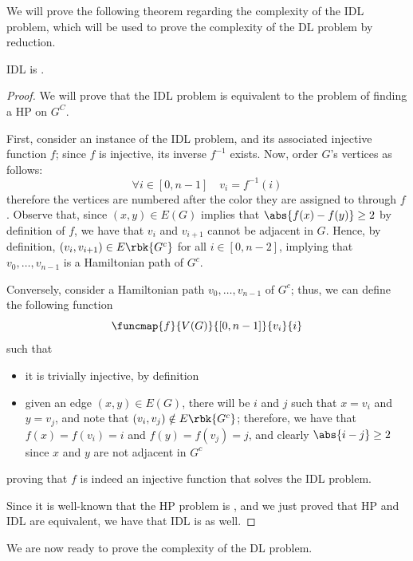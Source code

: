 \documentclass[a4paper, 12pt]{report}
\begin{document}
    We will prove the following theorem regarding the complexity of the IDL problem, which will be used to prove the complexity of the DL problem by reduction.

    \begin{framedthm}{}
        IDL is \NPComplete.
    \end{framedthm}

    \begin{proof}
        We will prove that the IDL problem is equivalent to the problem of finding a HP on $G^C$.

        First, consider an instance of the IDL problem, and its associated injective function $f$; since $f$ is injective, its inverse $f^{-1}$ exists. Now, order $G$'s vertices as follows: $$\forall i \in [0, n - 1] \quad v_i = f^{-1}(i)$$ therefore the vertices are numbered after the color they are assigned to through $f$. Observe that, since $(x, y) \in E(G)$ implies that $\abs{f(x) - f(y)} \ge 2$ by definition of $f$, we have that $v_i$ and $v_{i + 1}$ cannot be adjacent in $G$. Hence, by definition, $(v_i, v_{i + 1}) \in E\rbk{G^c}$ for all $i \in [0, n - 2]$, implying that $v_0 , \ldots, v_{n - 1}$ is a Hamiltonian path of $G^c$.

        Conversely, consider a Hamiltonian path $v_0, \ldots, v_{n - 1}$ of $G^c$; thus, we can define the following function $$\funcmap{f}{V(G)}{[0, n - 1]}{v_i}{i}$$ such that

        \begin{itemize}
            \item it is trivially injective, by definition
            \item given an edge $(x, y) \in E(G)$, there will be $i$ and $j$ such that $x = v_i$ and $y = v_j$, and note that $(v_i, v_j) \notin E\rbk{G^c}$; therefore, we have that $f(x) = f(v_i) = i$ and $f(y) = f(v_j) = j$, and clearly $\abs{i - j} \ge 2$ since $x$ and $y$ are not adjacent in $G^c$
        \end{itemize}
        
        proving that $f$ is indeed an injective function that solves the IDL problem.

        Since it is well-known that the HP problem is \NPComplete, and we just proved that HP and IDL are equivalent, we have that IDL is \NPComplete as well.
    \end{proof}

    We are now ready to prove the complexity of the DL problem.
\end{document}
